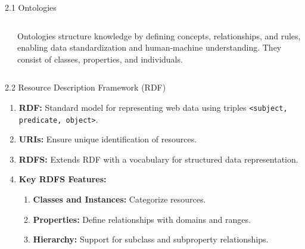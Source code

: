 \begin{frame}{2.1 Ontologies}

    \begin{columns}
        \begin{column}{5cm}
        \end{column}
        \begin{column}{5cm}
            \begin{bee}[]
                Ontologies structure knowledge by defining concepts, relationships, and rules, enabling data standardization and human-machine understanding. They consist of classes, properties, and individuals.
            \end{bee}
        \end{column}
    \end{columns}
\end{frame}

\begin{frame}{2.2 Resource Description Framework (RDF)}
    \begin{bee}
        \begin{enumerate}[$\bullet$]
        \item \textbf{RDF:} Standard model for representing web data using triples \texttt{<subject, predicate, object>}.  
        \item \textbf{URIs:} Ensure unique identification of resources.  
        \item \textbf{RDFS:} Extends RDF with a vocabulary for structured data representation.  
        \item \textbf{Key RDFS Features:}  
        \begin{enumerate}[$\bullet$]
            \item \textbf{Classes and Instances:} Categorize resources.  
            \item \textbf{Properties:} Define relationships with domains and ranges.  
            \item \textbf{Hierarchy:} Support for subclass and subproperty relationships.  
        \end{enumerate}
    \end{enumerate}
    \end{bee}
\end{frame}

